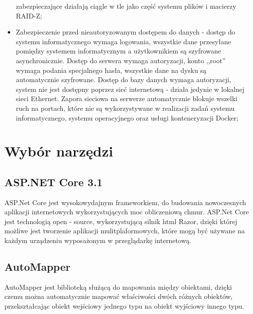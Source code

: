 \documentclass[12pt,a4paper]{article}
\begin{document}
\begin{itemize}
					zabezpieczające działają ciągle w tle jako część systemu plików i macierzy RAID-Z;
				\item Zabezpieczenie przed nieautoryzowanym dostępem do danych - dostęp do systemu informatycznego wymaga logowania, wszystkie dane przesyłane pomiędzy systemem informatycznym
					a użytkownikiem są szyfrowane asynchronicznie. Dostęp do serwera wymaga autoryzacji, konto ,,root'' wymaga podania specjalnego hasła, wszystkie dane na dysku
					są automatycznie szyfrowane. Dostęp do bazy danych wymaga autoryzacji, system nie jest dostępny poprzez sieć internetową - działa jedynie w lokalnej sieci Ethernet.
					Zapora sieciowa na serwerze automatycznie blokuje wszelki ruch na portach, które nie są wykorzystywane w realizacji zadań systemu informatycznego, systemu operacyjnego
					oraz usługi konteneryzacji Docker;
			\end{itemize}
					
	\newpage
	
	\section{Wybór narzędzi}
		\subsection{ASP.NET Core 3.1}
			\indent ASP.Net Core jest wysokowydajnym frameworkiem, do budowania nowoczesnych aplikacji internetowych wykorzystujących moc obliczeniową chmur. ASP.Net Core jest technologią
			open - source, wykorzystującą silnik html Razor, dzięki której możliwe jest tworzenie aplikacji mulitplaformowych, które mogą być używane na każdym urządzeniu wyposażonym
			w przeglądarkę internetową.

		\subsection{AutoMapper}
			\indent AutoMapper jest biblioteką służącą do mapowania między obiektami, dzięki czemu można automatycznie mapować właściwości dwóch różnych obiektów,
					przekształcając obiekt wejściowy jednego typu na obiekt wyjściowy innego typu.  
\end{document}
